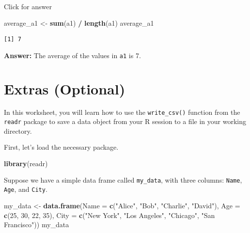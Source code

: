 \documentclass[
]{book}
\newenvironment{Shaded}{\begin{snugshade}}{\end{snugshade}}
\newcommand{\AttributeTok}[1]{\textcolor[rgb]{0.13,0.29,0.53}{#1}}
\newcommand{\DecValTok}[1]{\textcolor[rgb]{0.00,0.00,0.81}{#1}}
\newcommand{\FunctionTok}[1]{\textcolor[rgb]{0.13,0.29,0.53}{\textbf{#1}}}
\newcommand{\NormalTok}[1]{#1}
\newcommand{\OtherTok}[1]{\textcolor[rgb]{0.56,0.35,0.01}{#1}}
\newcommand{\SpecialCharTok}[1]{\textcolor[rgb]{0.81,0.36,0.00}{\textbf{#1}}}
\newcommand{\StringTok}[1]{\textcolor[rgb]{0.31,0.60,0.02}{#1}}
\begin{document}
Click for answer

\begin{Shaded}
\begin{Highlighting}[]
\NormalTok{average\_a1 }\OtherTok{\textless{}{-}} \FunctionTok{sum}\NormalTok{(a1) }\SpecialCharTok{/} \FunctionTok{length}\NormalTok{(a1)}
\NormalTok{average\_a1}
\end{Highlighting}
\end{Shaded}

\begin{verbatim}
[1] 7
\end{verbatim}

\textbf{Answer:} The average of the values in \texttt{a1} is 7.

\hypertarget{extras-optional-1}{%
\section{Extras (Optional)}\label{extras-optional-1}}

In this worksheet, you will learn how to use the \texttt{write\_csv()} function from the \texttt{readr} package to save a data object from your R session to a file in your working directory.

First, let's load the necessary package.

\begin{Shaded}
\begin{Highlighting}[]
\FunctionTok{library}\NormalTok{(readr)}
\end{Highlighting}
\end{Shaded}

Suppose we have a simple data frame called \texttt{my\_data}, with three columns: \texttt{Name}, \texttt{Age}, and \texttt{City}.

\begin{Shaded}
\begin{Highlighting}[]
\NormalTok{my\_data }\OtherTok{\textless{}{-}} \FunctionTok{data.frame}\NormalTok{(}\AttributeTok{Name =} \FunctionTok{c}\NormalTok{(}\StringTok{"Alice"}\NormalTok{, }\StringTok{"Bob"}\NormalTok{, }\StringTok{"Charlie"}\NormalTok{, }\StringTok{"David"}\NormalTok{),}
                      \AttributeTok{Age =} \FunctionTok{c}\NormalTok{(}\DecValTok{25}\NormalTok{, }\DecValTok{30}\NormalTok{, }\DecValTok{22}\NormalTok{, }\DecValTok{35}\NormalTok{),}
                      \AttributeTok{City =} \FunctionTok{c}\NormalTok{(}\StringTok{"New York"}\NormalTok{, }\StringTok{"Los Angeles"}\NormalTok{, }\StringTok{"Chicago"}\NormalTok{, }\StringTok{"San Francisco"}\NormalTok{))}
\NormalTok{my\_data}
\end{Highlighting}
\end{Shaded}
\end{document}
